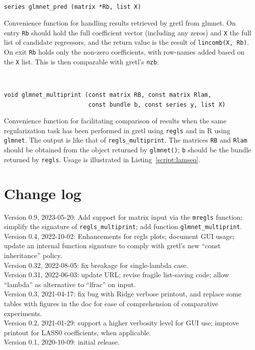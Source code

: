 \documentclass{article}
\newenvironment{funcdoc}
{\noindent\hrulefill\\[-12pt]}
{\medbreak}
\begin{document}
\begin{funcdoc}
\begin{verbatim}
series glmnet_pred (matrix *Rb, list X)
\end{verbatim}
  Convenience function for handling results retrieved by gretl from
  \textsf{glmnet}. On entry \texttt{Rb} should hold the full
  coefficient vector (including any zeros) and \texttt{X} the full
  list of candidate regressors, and the return value is the result of
  \texttt{lincomb(X, Rb)}. On exit \texttt{Rb} holds only the non-zero
  coefficients, with row-names added based on the \texttt{X}
  list. This is then comparable with gretl's \texttt{nzb}.
\end{funcdoc}

\begin{funcdoc}
\begin{verbatim}
void glmnet_multiprint (const matrix RB, const matrix Rlam,
                        const bundle b, const series y, list X)
\end{verbatim}
  Convenience function for facilitating comparison of results when the
  same regularization task has been performed in gretl using
  \texttt{regls} and in \textsf{R} using \texttt{glmnet}. The output
  is like that of \texttt{regls\_multiprint}.  The matrices
  \texttt{RB} and \texttt{Rlam} should be obtained from the object
  returned by \texttt{glmnet()}; \texttt{b} should be the bundle
  returned by \texttt{regls}.  Usage is illustrated in
  Listing~\ref{script:lamseq}.
\end{funcdoc}

\section{Change log}
\label{sec:changes}

Version 0.9, 2023-05-20: Add support for matrix input via the
\texttt{mregls} function; simplify the signature of
\texttt{regls\_multiprint}; add function \texttt{glmnet\_multiprint}.\\
Version 0.4, 2022-10-02: Enhancements for regls plots; document GUI
usage; update an internal function signature to comply with gretl's
new ``const inheritance'' policy.\\
Version 0.32, 2022-08-05: fix breakage for single-lambda case.\\
Version 0.31, 2022-06-03: update URL; revise fragile list-saving code;
allow ``lambda'' as alternative to ``lfrac'' on input.\\
Version 0.3, 2021-04-17: fix bug with Ridge verbose printout, and
replace some tables with figures in the doc for ease of comprehension
of comparative experiments.\\
Version 0.2, 2021-01-29: support a higher verbosity level for GUI use;
improve printout for LASS0 coefficients, when applicable.\\
Version 0.1, 2020-10-09: initial release.
\end{document}
